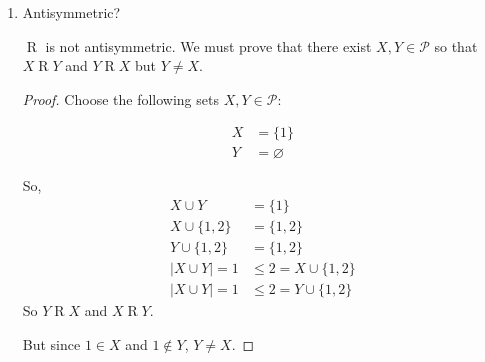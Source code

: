 \documentclass[]{article}
\begin{document}
\begin{enumerate}
\begin{enumerate}[label= (\alph*)]
\begin{enumerate}[label= (\roman*)]
\begin{proof}
                Note the following:

                \begin{align*} 
                    X\cup Y &= \{1,2,3\}\\
                    X\cup \{1,2\}&=\{1,2,3\}\\
                    Y\cup \{1,2\}&=\{1,2\}\\
                    |X\cup Y| =3&\leq3=|X\cup \{1,2\}|
                \end{align*}
                So, $X\mathrel{R}Y$.
                However, 
                
                \[|X\cup Y|=3>2=|Y\cup\{1,2\}|\] 
                
                So, $Y\not\mathrel{R}X$.
                Therefore, there exist $X,Y\in \mathcal{P}$ so that 
                $X\mathrel{R}Y$ but $Y\not\mathrel{R} X$, and $\mathrel{R}$ is not symmetric.
            \end{proof}
            \item Antisymmetric?

                $\mathrel{R}$ is not antisymmetric. We must prove that there exist 
                $X,Y\in\mathcal{P}$ so that $X\mathrel{R}Y$ and $Y\mathrel{R}X$ but
                $Y\neq X$.

                \begin{proof}
                    Choose the following sets $X,Y\in\mathcal{P}$:

                    \begin{align*} 
                        X&=\{1\}\\
                        Y&=\varnothing
                    \end{align*}

                    So, 
                    \begin{align*} 
                        X\cup Y &= \{1\}\\
                        X \cup \{1,2\}&=\{1,2\}\\
                        Y \cup \{1,2\}&=\{1,2\}\\
                        |X\cup Y| = 1&\leq2=X \cup \{1,2\}\\
                        |X\cup Y| = 1&\leq2=Y \cup \{1,2\}
                    \end{align*}
                    So $Y\mathrel{R}X$ and $X\mathrel{R}Y$.

                    But since $1\in X$ and $1\not\in Y$, $Y\neq X$.


\end{proof}
\end{enumerate}
\end{enumerate}
\end{enumerate}
\end{document}
